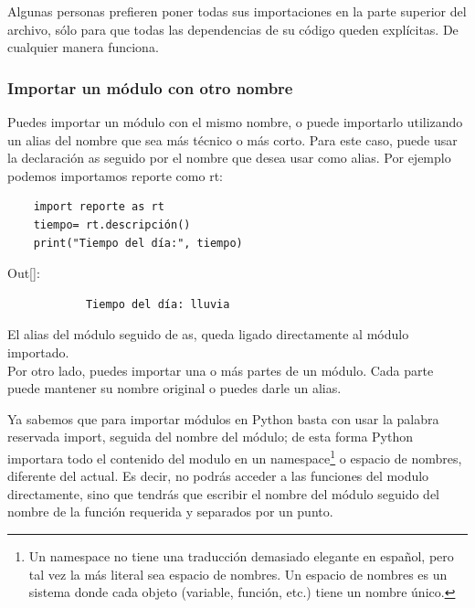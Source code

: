 \noindent Algunas personas prefieren poner todas sus importaciones en la parte superior del archivo,
sólo para que todas las dependencias de su código queden explícitas. De cualquier manera funciona.



\subsubsection{Importar un módulo con otro nombre}  


Puedes importar un módulo con el mismo nombre, o puede importarlo utilizando un alias del nombre que sea más técnico o más
corto. Para este caso, puede usar la declaración {\ttfamily as} seguido por el nombre que desea usar como alias. Por ejemplo podemos importamos {\ttfamily reporte} como  {\ttfamily rt}:

\hspace{-2.5cm}{\ttfamily \scriptsize un\_alias.py}  \vspace{-0.48cm}
\begin{lstlisting}		
	import reporte as rt
	tiempo= rt.descripción()
	print("Tiempo del día:", tiempo)	
\end{lstlisting}	

{\ttfamily\scriptsize\noindent Out[]: \vspace{-0.3cm}	
	{\color{blue} 	
		\begin{verbatim}
			Tiempo del día:	lluvia	
		\end{verbatim}
}}
El alias del módulo seguido de {\ttfamily as}, queda ligado directamente al módulo importado.\\

Por otro lado, puedes importar una o más partes de un módulo. Cada parte puede mantener su nombre original o puedes darle un alias.

Ya sabemos que para importar módulos en Python basta con usar la palabra reservada  {\ttfamily import}, seguida del nombre del módulo; de esta forma Python importara todo el contenido  del modulo en un namespace\footnote{Un namespace no tiene una traducción demasiado elegante en español, pero tal vez la más literal sea espacio de nombres. Un espacio de nombres es un sistema donde cada objeto (variable, función, etc.) tiene un nombre único.} o espacio de nombres, diferente del actual. Es decir, no podrás acceder a las funciones del modulo directamente, sino que tendrás que escribir el nombre del módulo seguido del nombre de la función requerida y separados por un punto. 


